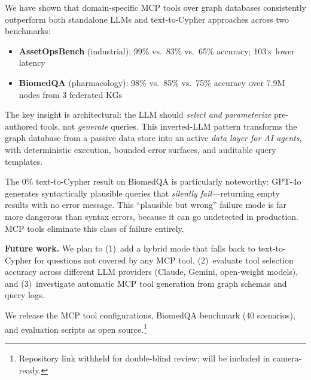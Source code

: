\documentclass[sigconf, anonymous, review]{acmart}
\begin{document}
We have shown that domain-specific MCP tools over graph databases
consistently outperform both standalone LLMs and text-to-Cypher
approaches across two benchmarks:

\begin{itemize}[leftmargin=*,nosep]
\item \textbf{AssetOpsBench} (industrial): 99\% vs.\ 83\% vs.\ 65\%
  accuracy; 103$\times$ lower latency
\item \textbf{BiomedQA} (pharmacology): 98\% vs.\ 85\% vs.\ 75\%
  accuracy over 7.9M nodes from 3 federated KGs
\end{itemize}

The key insight is architectural: the LLM should \emph{select and
parameterize} pre-authored tools, not \emph{generate} queries.
This inverted-LLM pattern transforms the graph database from a
passive data store into an active \emph{data layer for AI agents},
with deterministic execution, bounded error surfaces, and
auditable query templates.

The 0\% text-to-Cypher result on BiomedQA is particularly
noteworthy: GPT-4o generates syntactically plausible queries that
\emph{silently fail}---returning empty results with no error
message.  This ``plausible but wrong'' failure mode is far more
dangerous than syntax errors, because it can go undetected in
production.  MCP tools eliminate this class of failure entirely.

\smallskip\noindent\textbf{Future work.}
We plan to (1)~add a hybrid mode that falls back to text-to-Cypher
for questions not covered by any MCP tool, (2)~evaluate tool
selection accuracy across different LLM providers (Claude,
Gemini, open-weight models), and (3)~investigate automatic
MCP tool generation from graph schemas and query logs.

We release the MCP tool configurations, BiomedQA benchmark
(40 scenarios), and evaluation scripts as open
source.\footnote{Repository link withheld for double-blind review; will be included in camera-ready.}
\end{document}
